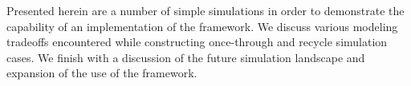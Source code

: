 Presented herein are a number of simple simulations in order to 
demonstrate the capability of an implementation of the framework. We 
discuss various modeling tradeoffs encountered while constructing 
once-through and recycle simulation cases. We finish with a 
discussion of the future simulation landscape and expansion of the 
use of the framework.
